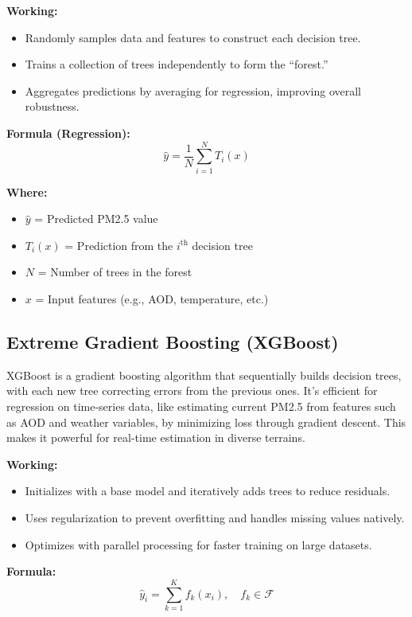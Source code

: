 \documentclass[12pt]{report}
\begin{document}
\noindent\textbf{Working:}
\begin{itemize}
    \item Randomly samples data and features to construct each decision tree.
    \item Trains a collection of trees independently to form the ``forest.''
    \item Aggregates predictions by averaging for regression, improving overall robustness.
\end{itemize}

\noindent\textbf{Formula (Regression):}
\[
\hat{y} = \frac{1}{N} \sum_{i=1}^{N} T_i(x)
\]

\noindent\textbf{Where:}
\begin{itemize}
    \item $\hat{y}$ = Predicted PM2.5 value
    \item $T_i(x)$ = Prediction from the $i^{\text{th}}$ decision tree
    \item $N$ = Number of trees in the forest
    \item $x$ = Input features (e.g., AOD, temperature, etc.)
\end{itemize}

\subsection{Extreme Gradient Boosting (XGBoost)}

XGBoost is a gradient boosting algorithm that sequentially builds decision trees, with each new tree correcting errors from the previous ones. It's efficient for regression on time-series data, like estimating current PM2.5 from features such as AOD and weather variables, by minimizing loss through gradient descent. This makes it powerful for real-time estimation in diverse terrains.

\noindent\textbf{Working:}
\begin{itemize}
    \item Initializes with a base model and iteratively adds trees to reduce residuals.
    \item Uses regularization to prevent overfitting and handles missing values natively.
    \item Optimizes with parallel processing for faster training on large datasets.
\end{itemize}

\noindent\textbf{Formula:}
\[
\hat{y}_i = \sum_{k=1}^{K} f_k(x_i), \quad f_k \in \mathcal{F}
\]
\end{document}
